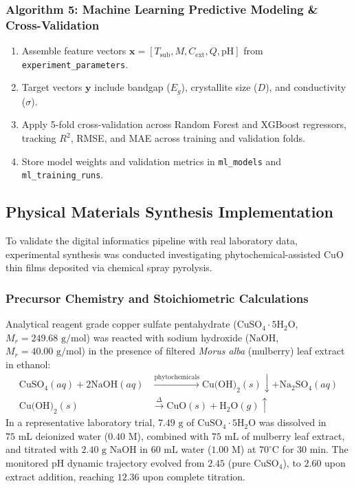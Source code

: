 \documentclass[12pt,a4paper,oneside]{report}
\begin{document}
{{{\subsubsection{Algorithm 5: Machine Learning Predictive Modeling \& Cross-Validation}
\begin{enumerate}
    \item Assemble feature vectors $\mathbf{x} = [T_{\text{sub}}, M, C_{\text{ext}}, Q, \text{pH}]$ from \texttt{experiment\_parameters}.
    \item Target vectors $\mathbf{y}$ include bandgap ($E_g$), crystallite size ($D$), and conductivity ($\sigma$).
    \item Apply 5-fold cross-validation across Random Forest and XGBoost regressors, tracking $R^2$, RMSE, and MAE across training and validation folds.
    \item Store model weights and validation metrics in \texttt{ml\_models} and \texttt{ml\_training\_runs}.
\end{enumerate}

\subsection{Physical Materials Synthesis Implementation}

To validate the digital informatics pipeline with real laboratory data, experimental synthesis was conducted investigating phytochemical-assisted $\text{CuO}$ thin films deposited via chemical spray pyrolysis.

\subsubsection{Precursor Chemistry and Stoichiometric Calculations}
Analytical reagent grade copper sulfate pentahydrate ($\text{CuSO}_4\cdot 5\text{H}_2\text{O}$, $M_r = 249.68\text{ g/mol}$) was reacted with sodium hydroxide ($\text{NaOH}$, $M_r = 40.00\text{ g/mol}$) in the presence of filtered \textit{Morus alba} (mulberry) leaf extract in ethanol:
\begin{align}
    \text{CuSO}_4(aq) + 2\text{NaOH}(aq) &\xrightarrow{\text{phytochemicals}} \text{Cu(OH)}_2(s)\downarrow + \text{Na}_2\text{SO}_4(aq) \\
    \text{Cu(OH)}_2(s) &\xrightarrow{\Delta} \text{CuO}(s) + \text{H}_2\text{O}(g)\uparrow
\end{align}
In a representative laboratory trial, $7.49\text{ g}$ of $\text{CuSO}_4\cdot 5\text{H}_2\text{O}$ was dissolved in $75\text{ mL}$ deionized water ($0.40\text{ M}$), combined with $75\text{ mL}$ of mulberry leaf extract, and titrated with $2.40\text{ g}$ $\text{NaOH}$ in $60\text{ mL}$ water ($1.00\text{ M}$) at $70^\circ\text{C}$ for $30\text{ min}$. The monitored pH dynamic trajectory evolved from $2.45$ (pure $\text{CuSO}_4$), to $2.60$ upon extract addition, reaching $12.36$ upon complete titration.

}}}
\end{document}
